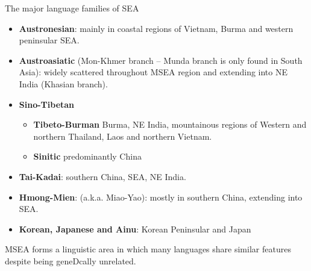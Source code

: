 \documentclass{beamer}
\begin{document}
\begin{frame}{The major language families of SEA}
  \begin{itemize}

\item \textbf{Austronesian}: mainly in coastal regions of Vietnam, Burma and
western peninsular SEA.

\item \textbf{Austroasiatic} (Mon-Khmer branch -- Munda branch is only found
in South Asia): widely scattered throughout MSEA region and extending
into NE India (Khasian branch).

\item \textbf{Sino-Tibetan}
\begin{itemize}
\item \textbf{Tibeto-Burman} Burma, NE India,
mountainous regions of Western and northern Thailand, Laos and northern
Vietnam.
\item \textbf{Sinitic}  predominantly China
\end{itemize}

\item \textbf{Tai-Kadai}: southern China, SEA, NE India.

\item \textbf{Hmong-Mien}: (a.k.a. Miao-Yao): mostly in southern China,
extending into SEA.
\item \textbf{Korean, Japanese and Ainu}: Korean Peninsular and Japan
\end{itemize}  
MSEA forms a linguistic area in which many languages share similar
features despite being geneDcally unrelated.

\end{frame}
\end{document}
